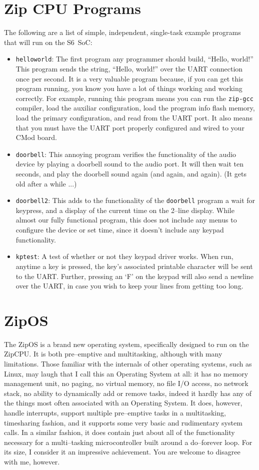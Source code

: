 \documentclass{gqtekspec}
\begin{document}
\section{Zip CPU Programs}
The following are a list of simple, independent, single-task example programs
that will run on the S6~SoC:
\begin{itemize}
\item {\tt helloworld}: The first program any programmer should build,
	``Hello, world!''  This program sends the string, ``Hello, world!''
	over the UART connection once per second.  It is a very valuable
	program because, if you can get this program running, you know you have
	a lot of things working and working correctly.  For example, running
	this program means you can run the {\tt zip-gcc} compiler, load
	the auxiliar configuration, load the program info flash memory, load
	the primary configuration, and read from the UART port.  It also means
	that you must have the UART port properly configured and wired to your
	CMod board.
\item {\tt doorbell}: This annoying program verifies the functionality of the
	audio device by playing a doorbell sound to the audio port.  It will
	then wait ten seconds, and play the doorbell sound again (and again,
	and again).  (It gets old after a while ...)
\item {\tt doorbell2}: This adds to the functionality of the {\tt doorbell}
	program a wait for keypress, and a display of the current time on the
	2--line display.  While almost our fully functional program, this
	does not include any menus to configure the device or set time, since
	it doesn't include any keypad functionality.
\item {\tt kptest}: A test of whether or not they keypad driver works.  When
	run, anytime a key is pressed, the key's associated printable character
	will be sent to the UART.  Further, pressing an `F' on the keypad will
	also send a newline over the UART, in case you wish to keep your lines
	from getting too long.
\end{itemize}
\section{ZipOS}
The ZipOS is a brand new operating system, specifically designed to run on the
ZipCPU.  It is both pre--emptive and multitasking, although with many
limitations.  Those familiar with the internals of other operating systems, such
as Linux, may laugh that I call this an Operating System at all: it has no
memory management unit, no paging, no virtual memory, no file I/O access, no
network stack, no ability to dynamically add or remove tasks, indeed it hardly
has any of the things most often associated with an Operating System.  It does,
however, handle interrupts, support multiple pre--emptive tasks in a
multitasking, timesharing fashion, and it supports some very basic and
rudimentary system calls.  In a similar fashion, it does contain just about all
of the functionality necessary for a multi--tasking microcontroller built
around a do--forever loop.  For its size, I consider it an impressive
achievement.  You are welcome to disagree with me, however.
\end{document}
